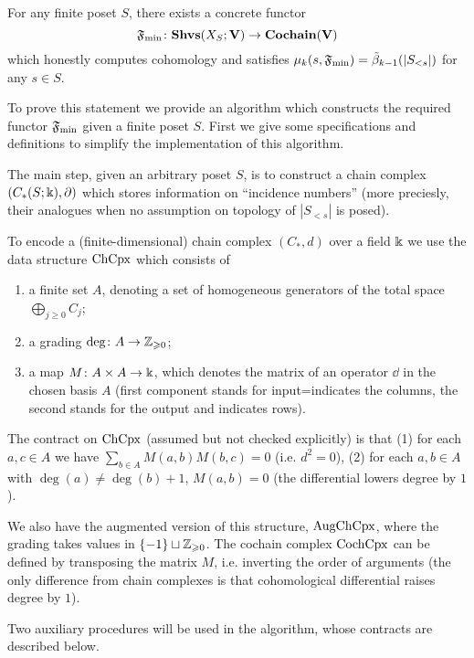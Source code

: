 \begin{thm}\label{thmExactBound}
For any finite poset $S$, there exists a concrete functor
\[
\mathfrak{F}_{\min}\colon\mathbf{Shvs}(X_S;\mathbf{V})\to\mathbf{Cochain}(\mathbf{V})
\]
which honestly computes cohomology and satisfies $\mu_k(s,\mathfrak{F}_{\min})=\tilde{\beta}_{k-1}(|S_{<s}|)$ for any $s\in S$.
\end{thm}

To prove this statement we provide an algorithm which constructs the required functor $\mathfrak{F}_{\min}$ given a finite poset $S$. First we give some specifications and definitions to simplify the implementation of this algorithm.

\begin{con}\label{conChainCpxDataStructure}
The main step, given an arbitrary poset $S$, is to construct a chain complex $(C_*(S;\Bbbk),\partial)$ which stores information on ``incidence numbers'' (more preciesly, their analogues when no assumption on topology of $|S_{<s}|$ is posed). 

To encode a (finite-dimensional) chain complex $(C_*,d)$ over a field $\Bbbk$ we use the data structure $\operatorname{ChCpx}$ which consists of
\begin{enumerate}
  \item a finite set $A$, denoting a set of homogeneous generators of the total space $\bigoplus_{j\geq 0}C_j$;
  \item a grading $\deg\colon A\to \mathbb{Z}_{\geqslant 0}$;
  \item a map $M\colon A\times A\to \Bbbk$, which denotes the matrix of an operator $\dd$ in the chosen basis $A$ (first component stands for input=indicates the columns, the second stands for the output and indicates rows).
\end{enumerate}
The contract on $\operatorname{ChCpx}$ (assumed but not checked explicitly) is that (1) for each $a,c\in A$ we have $\sum_{b\in A}M(a,b)M(b,c)=0$ (i.e. $d^2=0$), (2) for each $a,b\in A$ with $\deg(a)\neq \deg(b)+1$, $M(a,b)=0$ (the differential lowers degree by $1$).

We also have the augmented version of this structure, $\operatorname{AugChCpx}$, where the grading takes values in $\{-1\}\sqcup\mathbb{Z}_{\geqslant 0}$. The cochain complex $\operatorname{CochCpx}$ can be defined by transposing the matrix $M$, i.e. inverting the order of arguments (the only difference from chain complexes is that cohomological differential raises degree by $1$).
\end{con}

Two auxiliary procedures will be used in the algorithm, whose contracts are described below.

